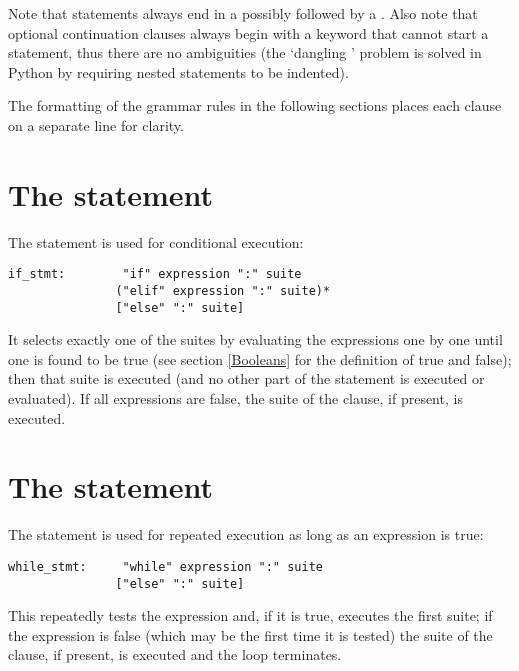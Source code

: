 Note that statements always end in a
 possibly followed by a
. Also note that optional
continuation clauses always begin with a keyword that cannot start a
statement, thus there are no ambiguities (the `dangling
' problem is solved in Python by requiring nested
 statements to be indented).

The formatting of the grammar rules in the following sections places
each clause on a separate line for clarity.

\section{The  statement\label{if}}

The  statement is used for conditional execution:

\begin{verbatim}
if_stmt:        "if" expression ":" suite
               ("elif" expression ":" suite)*
               ["else" ":" suite]
\end{verbatim}

It selects exactly one of the suites by evaluating the expressions one
by one until one is found to be true (see section \ref{Booleans} for
the definition of true and false); then that suite is executed (and no
other part of the  statement is executed or evaluated).  If
all expressions are false, the suite of the  clause, if
present, is executed.

\section{The  statement\label{while}}

The  statement is used for repeated execution as long
as an expression is true:

\begin{verbatim}
while_stmt:     "while" expression ":" suite
               ["else" ":" suite]
\end{verbatim}

This repeatedly tests the expression and, if it is true, executes the
first suite; if the expression is false (which may be the first time it
is tested) the suite of the  clause, if present, is
executed and the loop terminates.

